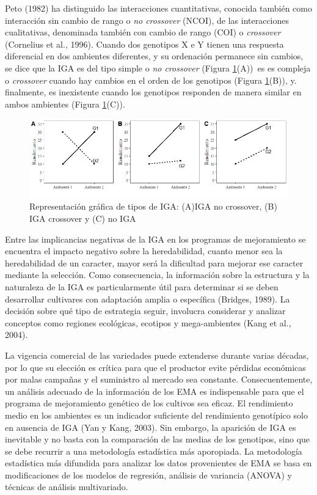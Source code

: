 Peto (1982) ha distinguido las interacciones cuantitativas, conocida también como interacción sin cambio de rango o \emph{no crossover} (NCOI), de las interacciones cualitativas, denominada también con
cambio de rango (COI) o \emph{crossover} (Cornelius et al., 1996). Cuando dos genotipos X e Y tienen una respuesta diferencial en dos ambientes diferentes, y su ordenación permanece sin cambios, se dice que la IGA es del tipo simple o \emph{no crossover} (Figura \ref{fig:fig11}(A))\, es es compleja o \emph{crossover} cuando hay cambios en el orden de los genotipos (Figura  \ref{fig:fig11}(B)), y. finalmente, es inexistente cuando los genotipos responden de manera similar en ambos ambientes (Figura \ref{fig:fig11}(C)). 


\begin{figure}[h]
\begin{center}
\includegraphics[width=14cm]{./Graficos/interac}
\end{center}
\caption{Representación gráfica de tipos de IGA: (A)IGA no crossover, (B) IGA crossover y (C) no IGA}
\label{fig:fig11}
\end{figure}


Entre las implicancias negativas de la IGA en los programas de mejoramiento se encuentra el impacto negativo sobre la heredabilidad, cuanto menor sea la heredabilidad de un caracter, mayor será la dificultad para mejorar ese caracter mediante la selección. Como consecuencia, la información sobre la estructura y la naturaleza de la IGA es particularmente útil para determinar si se deben desarrollar cultivares con adaptación amplia o específica (Bridges, 1989). La decisión sobre qué tipo de estrategia seguir, involucra considerar y analizar  conceptos como regiones ecológicas, ecotipos y mega-ambientes (Kang et al., 2004).


La vigencia comercial de las variedades puede extenderse durante varias décadas, por lo que su elección es crítica para que el productor evite pérdidas económicas por malas campañas y el suministro al mercado sea constante. Consecuentemente, un análisis adecuado de la información de los EMA es indispensable para que el programa de mejoramiento genético de los cultivos sea eficaz. El rendimiento medio en los ambientes es un indicador suficiente del rendimiento genotípico solo en ausencia de IGA (Yan y Kang, 2003). Sin embargo, la aparición de IGA es inevitable y no basta con la comparación de las medias de los genotipos, sino que se debe recurrir a una metodología estadística más aporopiada. La metodología estadística más difundida para analizar los datos provenientes de EMA se basa en modificaciones de los modelos de regresión, análisis de variancia (ANOVA) y técnicas de análisis multivariado. 


